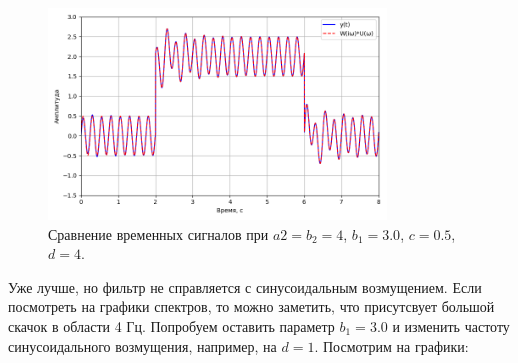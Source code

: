 \documentclass[a4paper]{article}
\begin{document}
\begin{figure}[H]
  \centering
  \includegraphics[width=0.8\textwidth]{src/task_1_2/1. time_comp_157_3_0.5.png}
  \caption{Сравнение временных сигналов при $a2 = b_2 = 4$, $b_1=3.0$, $c=0.5$, $d=4$.}
\end{figure}

Уже лучше, но фильтр не справляется с синусоидальным возмущением. Если посмотреть на графики спектров, то можно заметить, что присутсвует большой скачок в области 4 Гц. Попробуем оставить параметр $b_1 = 3.0$ и изменить частоту синусоидального возмущения, например, на $d = 1$. Посмотрим на графики:
\end{document}
